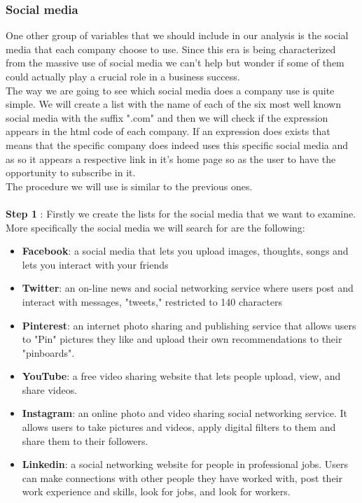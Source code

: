 \documentclass{article}
\begin{document}
\subsubsection{Social media}
One other group of variables that we should include in our analysis is the social media that each company choose to use. Since this era is being characterized from the massive use of social media we can't help but wonder if some of them could actually play a crucial role in a business success.\\
The way we are going to see which social media does a company use is quite simple. We will create a list with the name of each of the  six most well known social media with the suffix ".com" and then we will check if the expression appears in the html code of each company. If an expression does exists that means that the specific company does indeed uses this specific social media and as so it appears a respective link in it's home page so as the user to have the opportunity to subscribe in it.\\
The procedure we will use is similar to the previous ones.\\\\
\textbf{Step 1} : Firstly we create the lists for the social media that we want to examine. More specifically the social media we will search for are the following:
\begin{itemize}
\item\textbf{Facebook}: a social media that lets you upload images, thoughts, songs and lets you interact with your friends
\item\textbf{Twitter}: an on-line news and social networking service where users post and interact with messages, "tweets," restricted to 140 characters
\item\textbf{Pinterest}: an internet photo sharing and publishing service that allows users to "Pin" pictures they like and upload their own recommendations to their "pinboards".
\item\textbf{YouTube}: a free video sharing website that lets people upload, view, and share videos. 
\item\textbf{Instagram}: an online photo and video sharing social networking service. It allows users to take pictures and videos, apply digital filters to them and share them to their followers. 
\item\textbf{Linkedin}: a social networking website for people in professional jobs. Users can make connections with other people they have worked with, post their work experience and skills, look for jobs, and look for workers.
\end{itemize}
\end{document}
